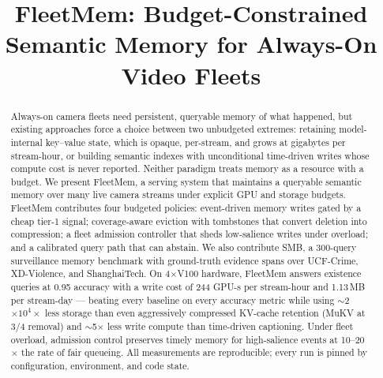 \documentclass[sigconf,anonymous]{acmart}
\title{FleetMem: Budget-Constrained Semantic Memory for Always-On Video Fleets}
\newcommand{\sys}{FleetMem\xspace}
\begin{document}
\begin{abstract}
Always-on camera fleets need persistent, queryable memory of what happened, but existing approaches force a choice between two unbudgeted extremes: retaining model-internal key--value state, which is opaque, per-stream, and grows at gigabytes per stream-hour, or building semantic indexes with unconditional time-driven writes whose compute cost is never reported. Neither paradigm treats memory as a resource with a budget. We present \sys, a serving system that maintains a queryable semantic memory over many live camera streams under explicit GPU and storage budgets. \sys contributes four budgeted policies: event-driven memory writes gated by a cheap tier-1 signal; coverage-aware eviction with tombstones that convert deletion into compression; a fleet admission controller that sheds low-salience writes under overload; and a calibrated query path that can abstain. We also contribute SMB, a 300-query surveillance memory benchmark with ground-truth evidence spans over UCF-Crime, XD-Violence, and ShanghaiTech. On 4$\times$V100 hardware, \sys answers existence queries at 0.95 accuracy with a write cost of 244 GPU-s per stream-hour and 1.13\,MB per stream-day --- beating every baseline on every accuracy metric while using $\sim$2$\times 10^4\times$ less storage than even aggressively compressed KV-cache retention (MuKV at 3/4 removal) and $\sim$5$\times$ less write compute than time-driven captioning. Under fleet overload, admission control preserves timely memory for high-salience events at 10--20$\times$ the rate of fair queueing. All measurements are reproducible; every run is pinned by configuration, environment, and code state.
\end{abstract}

\maketitle












\appendix

\end{document}
